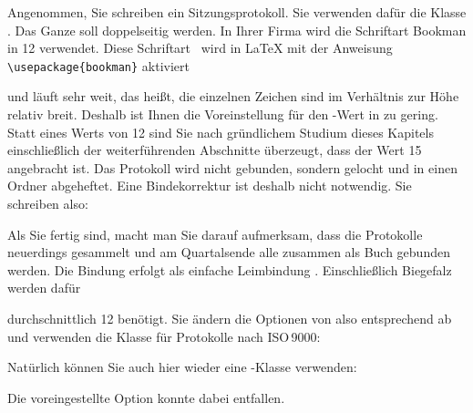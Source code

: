 \begin{Example}
  Angenommen, Sie schreiben ein Sitzungsprotokoll. Sie verwenden dafür die
  Klasse . Das Ganze soll doppelseitig werden. In Ihrer Firma
  wird die Schriftart Bookman in 12 verwendet. Diese Schriftart%
  \iffalse %
  , die zu den Standard-PostScript-Schriften gehört,%
  \fi\ wird in {\LaTeX} mit der
  Anweisung \verb|\usepackage{bookman}| aktiviert %
  \iffalse %
  . Die Schriftart Bookman %
  \else
  und %
  \fi läuft sehr weit, das heißt, die einzelnen Zeichen sind im Verhältnis zur
  Höhe relativ breit. Deshalb ist Ihnen die Voreinstellung für den
  -Wert in  zu gering. Statt eines Werts von 12
  sind Sie nach gründlichem Studium dieses Kapitels einschließlich der
  weiterführenden Abschnitte überzeugt, dass der Wert 15 angebracht ist. Das
  Protokoll wird nicht gebunden, sondern gelocht und in einen Ordner
  abgeheftet. Eine Bindekorrektur ist deshalb nicht notwendig. Sie schreiben
  also:
  Als Sie fertig sind, macht man Sie darauf aufmerksam, dass die
  Protokolle neuerdings gesammelt und am Quartalsende alle zusammen
  als Buch gebunden werden. Die Bindung erfolgt als
  einfache Leimbindung%
  \iffalse%
  , weil den Band ohnehin nie wieder jemand
  anschaut und er nur wegen ISO\,9000 angefertigt wird. Für die Bindung
  einschließlich Biegefalz werden %
  \else%
  . Einschließlich Biegefalz werden dafür %
  \fi
  durchschnittlich 12 benötigt. Sie ändern die Optionen von
   also entsprechend ab und verwenden die Klasse für
  Protokolle nach ISO\,9000:
  Natürlich können Sie auch hier wieder eine \KOMAScript-Klasse
  verwenden:
\iftrue%
\iftrue
  Die voreingestellte Option  konnte dabei entfallen.
\else
  Option \Option{a4paper} entspricht der Voreinstellung und konnte daher
  entfallen.
\fi
\else
  Die Option \Option{a4paper} konnte bei der Klasse \Class{scrartcl} entfallen,
  da diese der Voreinstellung bei allen \KOMAScript-Klassen entspricht.
\fi
\end{Example}

